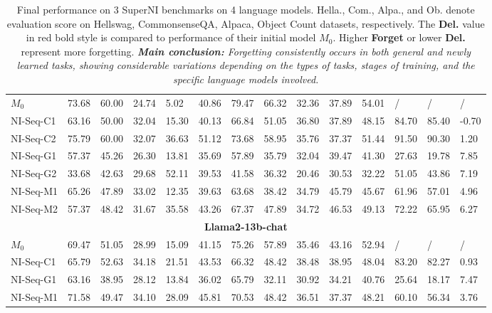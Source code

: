 \begin{table*}[]
\begin{center}
\begin{tiny}
\begin{tabular}{l|llllr|llllr|lll}
$M_0$ & 73.68 & 60.00 & 24.74 & 5.02 & 40.86 & 79.47 & 66.32 & 32.36 & 37.89 & 54.01 & / & / & / \\
NI-Seq-C1 & 63.16 & 50.00 & 32.04 & 15.30 & 40.13 & 66.84 & 51.05 & 36.80 & 37.89 & 48.15 & 84.70 & 85.40 & -0.70 \\
NI-Seq-C2 & 75.79 & 60.00 & 32.07 & 36.63 & 51.12 & 73.68 & 58.95 & 35.76 & 37.37 & 51.44 & 91.50 & 90.30 & 1.20 \\
NI-Seq-G1 & 57.37 & 45.26 & 26.30 & 13.81 & 35.69 & 57.89 & 35.79 & 32.04 & 39.47 & 41.30 & 27.63 & 19.78 & 7.85 \\
NI-Seq-G2 & 33.68 & 42.63 & 29.68 & 52.11 & 39.53 & 41.58 & 36.32 & 20.46 & 30.53 & 32.22 & 51.05 & 43.86 & 7.19 \\
NI-Seq-M1 & 65.26 & 47.89 & 33.02 & 12.35 & 39.63 & 63.68 & 38.42 & 34.79 & 45.79 & 45.67 & 61.96 & 57.01 & 4.96 \\
NI-Seq-M2 & 57.37 & 48.42 & 31.67 & 35.58 & 43.26 & 67.37 & 47.89 & 34.72 & 46.53 & 49.13 & 72.22 & 65.95 & 6.27 \\ \midrule 
 \multicolumn{14}{c}{\textbf{Llama2-13b-chat}} \\ \midrule
$M_0$ & 69.47 & 51.05 & 28.99 & 15.09 & 41.15 & 75.26 & 57.89 & 35.46 & 43.16 & 52.94 & / & / & / \\
NI-Seq-C1  & 65.79 & 52.63 & 34.18 & 21.51 & 43.53 & 66.32 & 48.42 & 38.48 & 38.95 & 48.04 & 83.20 & 82.27 & 0.93 \\
NI-Seq-G1  & 63.16 & 38.95 & 28.12 & 13.84 & 36.02 & 65.79 & 32.11 & 30.92 & 34.21 & 40.76 & 25.64 & 18.17 & 7.47 \\
NI-Seq-M1  & 71.58 & 49.47 & 34.10 & 28.09 & 45.81 & 70.53 & 48.42 & 36.51 & 37.37 & 48.21 & 60.10 & 56.34 & 3.76\\ \bottomrule

\end{tabular}
\caption{Final performance on 3 SuperNI benchmarks on 4 language models. Hella., Com., Alpa., and Ob. denote evaluation score on Hellswag, CommonsenseQA, Alpaca, Object Count datasets, respectively. The \textbf{Del.} value in red bold style is compared to performance of their initial model $M_0$. Higher \textbf{Forget} or lower \textbf{Del.} represent more forgetting. \textit{\textbf{Main conclusion: }Forgetting consistently occurs in both general and newly learned tasks, showing considerable variations depending on the types of tasks, stages of training, and the specific language models involved.}}
\vspace{-0.7em}
\label{table:app:more}
\end{tiny}
\end{center}
\end{table*}


